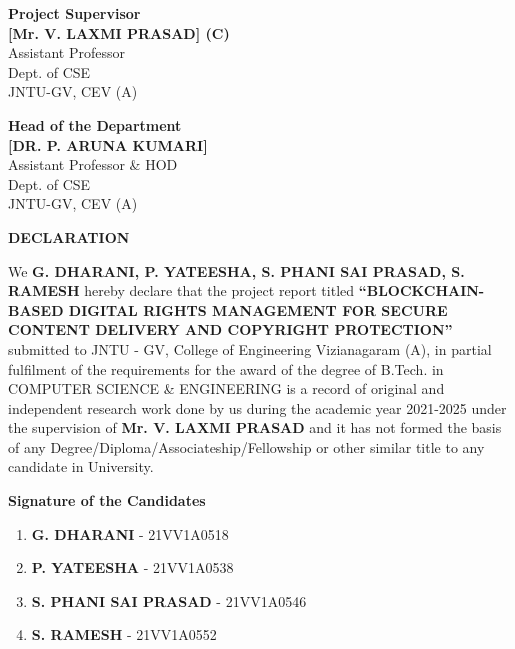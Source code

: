 \documentclass[12pt,a4paper]{report}
\begin{document}
\vspace{2.5cm}

\noindent
\begin{minipage}[t]{0.5\textwidth}
\textbf{Project Supervisor}\\
\textbf{[Mr. V. LAXMI PRASAD] (C)}\\
Assistant Professor\\
Dept. of CSE\\
JNTU-GV, CEV (A)
\end{minipage}%
\begin{minipage}[t]{0.5\textwidth}
\raggedleft
\textbf{Head of the Department}\\
\textbf{[DR. P. ARUNA KUMARI]}\\
Assistant Professor \& HOD\\
Dept. of CSE\\
JNTU-GV, CEV (A)
\end{minipage}

\newpage
\begin{center}
    \Large{\textbf{DECLARATION}}
\end{center}

\vspace{1cm}
\noindent
We \textbf{G. DHARANI, P. YATEESHA, S. PHANI SAI PRASAD, S. RAMESH} hereby declare that the project report titled \textbf{``BLOCKCHAIN-BASED DIGITAL RIGHTS MANAGEMENT FOR SECURE CONTENT DELIVERY AND COPYRIGHT PROTECTION''} submitted to JNTU - GV, College of Engineering Vizianagaram (A), in partial fulfilment of the requirements for the award of the degree of B.Tech. in COMPUTER SCIENCE \& ENGINEERING is a record of original and independent research work done by us during the academic year 2021-2025 under the supervision of \textbf{Mr. V. LAXMI PRASAD} and it has not formed the basis of any Degree/Diploma/Associateship/Fellowship or other similar title to any candidate in University.

\vspace{2cm}

\noindent
\textbf{Signature of the Candidates}

\vspace{1.5cm}
\begin{enumerate}
    \item \textbf{G. DHARANI} - 21VV1A0518 \hfill \makebox[2in]{\hrulefill}
    \vspace{0.5cm}
    \item \textbf{P. YATEESHA} - 21VV1A0538 \hfill \makebox[2in]{\hrulefill}
    \vspace{0.5cm}
    \item \textbf{S. PHANI SAI PRASAD} - 21VV1A0546 \hfill \makebox[2in]{\hrulefill}
    \vspace{0.5cm}
    \item \textbf{S. RAMESH} - 21VV1A0552 \hfill \makebox[2in]{\hrulefill}
\end{enumerate}
\end{document}
